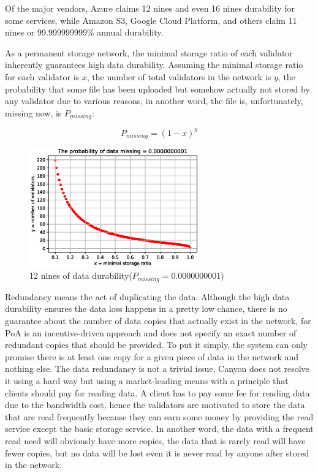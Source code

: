 \documentclass[]{article}
\newcounter{subsubsubsection}[subsubsection]
\begin{document}
Of the major vendors, Azure claims 12 nines and even 16 nines durability for some services, while Amazon S3, Google Cloud Platform, and others claim 11 nines or 99.999999999\% annual durability.

As a permanent storage network, the minimal storage ratio of each validator inherently guarantees high data durability. Assuming the minimal storage ratio for each validator is $x$, the number of total validators in the network is $y$, the probability that some file has been uploaded but somehow actually not stored by any validator due to various reasons, in another word, the file is, unfortunately, missing now, is $P_{missing}$:

$$
P_{missing} = (1-x)^y
$$

\begin{figure}[H]
\centering
\includegraphics[width=0.65\textwidth]{P_data_missing}
  \caption{12 nines of data durability($P_{missing} = 0.0000000001$)}
\label{Fig.P_data_missing}
\end{figure}


Redundancy means the act of duplicating the data. Although the high data durability ensures the data loss happens in a pretty low chance, there is no guarantee about the number of data copies that actually exist in the network, for PoA is an incentive-driven approach and does not specify an exact number of redundant copies that should be provided. To put it simply, the system can only promise there is at least one copy for a given piece of data in the network and nothing else. The data redundancy is not a trivial issue, Canyon does not resolve it using a hard way but using a market-leading means with a principle that clients should pay for reading data. A client has to pay some fee for reading data due to the bandwidth cost, hence the validators are motivated to store the data that are read frequently because they can earn some money by providing the read service except the basic storage service. In another word, the data with a frequent read need will obviously have more copies, the data that is rarely read will have fewer copies, but no data will be lost even it is never read by anyone after stored in the network.
\end{document}
